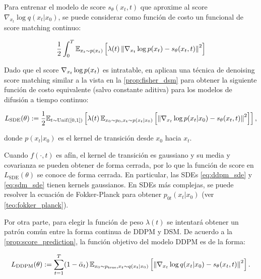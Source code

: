 
Para  entrenar el modelo de score $s_\theta(x_t,t)$ que aproxime al score $\nabla_{x_t}\log q(x_t|x_0)$, se puede considerar como función de costo un funcional de score matching continuo:

\begin{equation*}
    \frac{1}{2}\int_0^T \mathbb{E}_{x_t\sim p(x_t)}\left[\lambda(t)\left\lVert \nabla_{x_t} \log p(x_t)-s_\theta(x_t,t) \right\rVert^2\right]
\end{equation*}

Dado que el score $\nabla_{x_t} \log p(x_t)$ es intratable, en \cite{song2021scorebased} aplican una técnica de denoising score matching similar a la vista en la \autoref{prop:fisher_dsm} para obtener la siguiente función de costo equivalente (salvo constante aditiva) para los modelos de difusión a tiempo continuo:

\begin{equation}
    \label{eq:loss_continuous_dm}
    L_{\text{SDE}}(\theta) :=\frac{1}{2} \mathbb{E}_{t\sim\operatorname{Unif}([0,1])}\left[\lambda(t)\,\mathbb{E}_{x_0\sim p_0, x_t\sim p(x_t|x_0)}\left[\left\lVert \nabla_{x_t} \log p(x_t|x_0) - s_\theta(x_t,t) \right\rVert^2\right]\right],
\end{equation}

donde $p(x_t|x_0)$ es el kernel de transición desde $x_0$ hacia $x_t$. 

Cuando $f(\cdot,t)$ es afín, el kernel de transición es gaussiano y su media y covarianza se pueden obtener de forma cerrada, por lo que la función de score en $L_{\text{SDE}}(\theta)$ se conoce de forma cerrada. En particular, las SDEs \eqref{eq:ddpm_sde} y \eqref{eq:sdm_sde} tienen kernels gaussianos. En SDEs más complejas, se puede resolver la ecuación de Fokker-Planck para obtener $p_{0t}(x_t|x_0)$ (ver \autoref{teo:fokker_planck}).

Por otra parte, para elegir la función de peso $\lambda(t)$ se intentará obtener un patrón común entre la forma continua de DDPM y DSM. De acuerdo a la \autoref{prop:score_prediction}, la función objetivo del modelo DDPM es de la forma:

\begin{equation*}
    L_{\text{DDPM}}(\theta) := \sum_{t=1}^T (1-\bar\alpha_t)\,\mathbb{E}_{x_0\sim p_{\operatorname{true}}, x_t\sim q(x_t|x_0)}\left[\left\lVert \nabla_{x_t}\log q(x_t|x_0) - s_\theta(x_t,t) \right\rVert^2\right].
\end{equation*}

